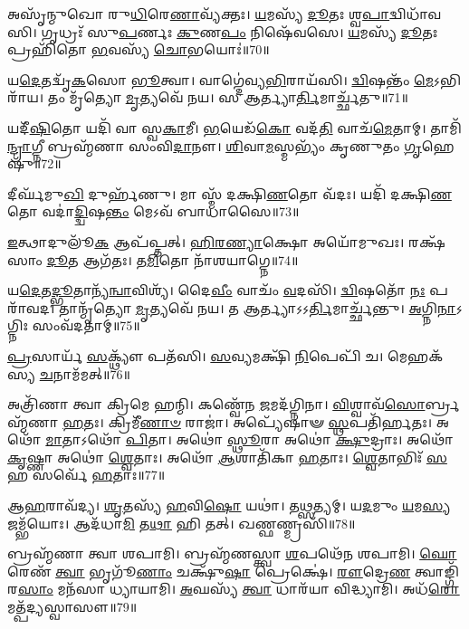𑌅𑌸𑍃᳴𑌨𑍍𑌮𑍁𑌖𑍋 𑌰𑍁\-\ul{𑌧𑌿}\-𑌰𑍇\-\ul{𑌣𑌾}\-𑌵𑍍𑌯᳴𑌕𑍍𑌤𑌃। 
\-\ul{𑌯}\-𑌮𑌸𑍍𑌯᳴ \ul{𑌦𑍂}\-𑌤𑌃  𑌶𑍍𑌵\-\ul{𑌪𑌾}\-𑌦𑍍𑌵𑌿𑌧𑌾᳴𑌵𑌸𑌿। 
𑌗𑍃𑌧𑍍𑌰𑌃᳴ 𑌸𑍁\-\ul{𑌪}\-𑌰𑍍𑌣𑌃 \ul{𑌕𑍁}\-𑌣\-\ul{𑌪𑌂} 𑌨𑌿𑌷𑍇᳴𑌵𑌸𑍇। 
\-\ul{𑌯}\-𑌮𑌸𑍍𑌯᳴ \ul{𑌦𑍂}\-𑌤𑌃 𑌪𑍍𑌰𑌹𑌿᳴𑌤𑍋 \ul{𑌭}\-𑌵𑌸𑍍𑌯᳴ \ul{𑌚𑍋}\-𑌭𑌯𑍋𑌃॑॥70॥%
\anuvakamend

𑌯\-\ul{𑌦𑍇}\-𑌤𑌦𑍍𑌵𑍃᳴\-\ul{𑌕}\-𑌸𑍋 \ul{𑌭𑍂}\-𑌤𑍍𑌵𑌾। 
𑌵𑌾𑌗𑍍𑌦𑍇॑𑌵𑍍𑌯\-\ul{𑌭𑌿}\-𑌰𑌾𑌯᳴𑌸𑌿। 
\-\ul{𑌦𑍍𑌵𑌿}\-𑌷𑌨𑍍𑌤𑌂᳴ \ul{𑌮𑍇}\-𑌽𑌭𑌿𑌰𑌾᳴𑌯। 
𑌤𑌂 𑌮𑍃᳴𑌤𑍍𑌯𑍋 \ul{𑌮𑍃}\-𑌤𑍍𑌯𑌵𑍇᳴ 𑌨𑌯। 
𑌸 𑌆𑌰𑍍𑌤𑍍𑌯𑌾\-\ul{𑌰𑍍𑌤𑌿}\-𑌮𑌾𑌰𑍍𑌚𑍍𑌛᳴𑌤𑍁॥71॥%
\anuvakamend

𑌯𑌦𑍀᳴\-\ul{𑌷𑌿}\-𑌤𑍋 𑌯𑌦𑌿᳴ 𑌵𑌾 𑌸𑍍𑌵\-\ul{𑌕𑌾}\-𑌮𑍀। 
\-\ul{𑌭}\-𑌯𑍇𑌡᳴\-\ul{𑌕𑍋} 𑌵𑌦᳴\-\ul{𑌤𑌿} 𑌵𑌾𑌚᳴\-\ul{𑌮𑍇}\-𑌤𑌾𑌮𑍍। 
𑌤𑌾𑌮𑌿᳴\-\ul{𑌨𑍍𑌦𑍍𑌰𑌾}\-𑌗𑍍𑌨𑍀 𑌬𑍍𑌰𑌹𑍍𑌮᳴𑌣𑌾 𑌸𑌂𑌵𑌿\-\ul{𑌦𑌾}\-𑌨𑍗। 
\-\ul{𑌶𑌿}\-𑌵𑌾\-\ul{𑌮}\-𑌸𑍍𑌮𑌭𑍍𑌯𑌂᳴ 𑌕𑍃𑌣𑍁𑌤𑌂 \ul{𑌗𑍃}\-𑌹𑍇𑌷𑍁᳴॥72॥%
\anuvakamend

𑌦𑍀𑌰𑍍𑌘᳴𑌮𑍁\-\ul{𑌖𑌿} 𑌦𑍁𑌰𑍍\mbox{}𑌹᳴𑌣𑍁। 
𑌮𑌾 𑌸𑍍𑌮᳴ 𑌦𑌕𑍍𑌷𑌿\-\ul{𑌣}\-𑌤𑍋 𑌵᳴𑌦𑌃। 
𑌯𑌦𑌿᳴ 𑌦𑌕𑍍𑌷𑌿\-\ul{𑌣}\-𑌤𑍋 𑌵𑌦𑌾॑\-\ul{𑌦𑍍𑌦𑍍𑌵𑌿}\-𑌷\-\ul{𑌨𑍍𑌤𑌂} 𑌮𑍇𑌽𑌵᳴ 𑌬𑌾𑌧𑌾𑌸𑍈॥73॥
\anuvakamend

\-\ul{𑌇}\-𑌤𑍍𑌥𑌾𑌦𑍁𑌲𑍂᳴\-\ul{𑌕} 𑌆𑌪᳴𑌪𑍍𑌤𑌤𑍍। 
\-\ul{𑌹𑌿}\-\-\ul{𑌰}\-\-\ul{𑌣𑍍𑌯𑌾}\-𑌕𑍍𑌷𑍋 𑌅𑌯𑍋᳴𑌮𑍁𑌖𑌃। 
𑌰𑌕𑍍𑌷᳴𑌸𑌾𑌂 \ul{𑌦𑍂}\-𑌤 𑌆𑌗᳴𑌤𑌃। 
𑌤\-\ul{𑌮𑌿}\-𑌤𑍋 𑌨𑌾᳴𑌶𑌯𑌾𑌗𑍍𑌨𑍇॥74॥
\anuvakamend


𑌯\-\ul{𑌦𑍇}\-𑌤\-\ul{𑌦𑍍𑌭𑍂}\-𑌤𑌾𑌨𑍍𑌯᳴\-\ul{𑌨𑍍𑌵𑌾}\-𑌵𑌿𑌶𑍍𑌯᳴। 
𑌦𑍈\-\ul{𑌵𑍀𑌂} 𑌵𑌾𑌚𑌂᳴ \ul{𑌵}\-𑌦𑌸𑌿᳴। 
\-\ul{𑌦𑍍𑌵𑌿}\-𑌷𑌤𑍋᳴ \ul{𑌨𑌃} 𑌪𑌰𑌾᳴𑌵𑌦। 
𑌤𑌾𑌨𑍍𑌮𑍃᳴𑌤𑍍𑌯𑍋 \ul{𑌮𑍃}\-𑌤𑍍𑌯𑌵𑍇᳴ 𑌨𑌯। 
𑌤 𑌆𑌰𑍍𑌤𑍍𑌯𑌾𑌽𑌽\-\ul{𑌰𑍍𑌤𑌿}\-𑌮𑌾𑌰𑍍𑌚𑍍𑌛᳴𑌨𑍍𑌤𑍁। 
\-\ul{𑌅}\-𑌗𑍍𑌨𑌿\-\ul{𑌨𑌾}\-𑌽𑌗𑍍𑌨𑌿𑌃 𑌸𑌂𑌵᳴𑌦𑌤𑌾𑌮𑍍॥75॥
\anuvakamend


\-\ul{𑌪𑍍𑌰}\-𑌸𑌾𑌰𑍍𑌯᳴ \ul{𑌸}\-𑌕𑍍𑌥𑍍𑌯𑍗᳴ 𑌪𑌤᳴𑌸𑌿। 
\-\ul{𑌸}\-𑌵𑍍𑌯𑌮𑌕𑍍𑌷𑌿᳴ \ul{𑌨𑌿}\-𑌪𑍇𑌪𑌿᳴ 𑌚। 
𑌮𑍇𑌹𑌕᳴𑌸𑍍𑌯 \ul{𑌚}\-𑌨𑌾𑌮᳴𑌮𑌤𑍍॥76॥
\anuvakamend


𑌅𑌤𑍍𑌰𑌿᳴𑌣𑌾 𑌤𑍍𑌵𑌾 𑌕𑍍𑌰𑌿𑌮𑍇 𑌹𑌨𑍍𑌮𑌿। 
𑌕𑌣𑍍𑌵𑍇᳴𑌨 \ul{𑌜}\-𑌮𑌦᳴𑌗𑍍𑌨𑌿𑌨𑌾। 
\-\ul{𑌵𑌿}\-𑌶𑍍𑌵𑌾𑌵᳴\-\ul{𑌸𑍋}\-𑌰𑍍𑌬𑍍𑌰𑌹𑍍𑌮᳴𑌣𑌾 \ul{𑌹}\-𑌤𑌃। 
𑌕𑍍𑌰𑌿𑌮𑍀᳴\-\ul{𑌣𑌾}\-\-\ul{𑍞} 𑌰𑌾𑌜𑌾॑। 
𑌅𑌪𑍍𑌯𑍇᳴𑌷𑌾𑍟 \ul{𑌸𑍍𑌥}\-𑌪𑌤𑌿᳴𑌰𑍍\mbox{}\-\ul{𑌹}\-𑌤𑌃। 
𑌅𑌥𑍋᳴ \ul{𑌮𑌾}\-𑌤𑌾𑌽𑌥𑍋᳴ \ul{𑌪𑌿}\-𑌤𑌾। 
𑌅𑌥𑍋॑ \ul{𑌸𑍍𑌥𑍂}\-𑌰𑌾 𑌅𑌥𑍋॑ \ul{𑌕𑍍𑌷𑍁}\-𑌦𑍍𑌰𑌾𑌃। 
𑌅𑌥𑍋᳴ \ul{𑌕𑍃}\-𑌷𑍍𑌣𑌾 𑌅𑌥𑍋॑ \ul{𑌶𑍍𑌵𑍇}\-𑌤𑌾𑌃। 
𑌅𑌥𑍋᳴ \ul{𑌆}\-𑌶𑌾𑌤𑌿᳴𑌕𑌾 \ul{𑌹}\-𑌤𑌾𑌃। 
\-\ul{𑌶𑍍𑌵𑍇}\-𑌤𑌾𑌭𑌿𑌃᳴ \ul{𑌸}\-𑌹 𑌸𑌰𑍍𑌵𑍇᳴ \ul{𑌹}\-𑌤𑌾𑌃॥77॥
\anuvakamend


𑌆\-\ul{𑌹}\-𑌰𑌾𑌵᳴𑌦𑍍𑌯। 
\-\ul{𑌶𑍃}\-𑌤𑌸𑍍𑌯᳴ \ul{𑌹}\-𑌵𑌿\-\ul{𑌷𑍋} 𑌯𑌥𑌾॑। 
𑌤\-\ul{𑌥𑍍𑌸}\-𑌤𑍍𑌯𑌮𑍍। 
𑌯\-\ul{𑌦}\-𑌮𑍁𑌂 \ul{𑌯}\-𑌮\-\ul{𑌸𑍍𑌯} 𑌜𑌮𑍍𑌭᳴𑌯𑍋𑌃। 
𑌆𑌦᳴𑌧𑌾\-\ul{𑌮𑌿} 𑌤\-\ul{𑌥𑌾} 𑌹𑌿 𑌤𑌤𑍍। 
𑌖𑌣𑍍𑌫𑌣𑍍𑌮𑍍𑌰𑌸𑌿᳴॥78॥
\anuvakamend


𑌬𑍍𑌰𑌹𑍍𑌮᳴𑌣𑌾 𑌤𑍍𑌵𑌾 𑌶𑌪𑌾𑌮𑌿। 
𑌬𑍍𑌰𑌹𑍍𑌮᳴𑌣𑌸𑍍𑌤𑍍𑌵𑌾 \ul{𑌶}\-𑌪𑌥𑍇᳴𑌨 𑌶𑌪𑌾𑌮𑌿। 
\-\ul{𑌘𑍋}\-𑌰𑍇𑌣᳴ \ul{𑌤𑍍𑌵𑌾} 𑌭𑍃𑌗𑍂᳴\-\ul{𑌣𑌾𑌂} 𑌚𑌕𑍍𑌷𑍁᳴\-\ul{𑌷𑌾} 𑌪𑍍𑌰𑍇𑌕𑍍𑌷𑍇॑। 
\-\ul{𑌰𑍗}\-𑌦𑍍𑌰𑍇\-\ul{𑌣} 𑌤𑍍𑌵𑌾𑌙𑍍𑌗𑌿᳴𑌰\-\ul{𑌸𑌾𑌂} 𑌮𑌨᳴𑌸𑌾 𑌧𑍍𑌯𑌾𑌯𑌾𑌮𑌿। 
\-\ul{𑌅}\-𑌘𑌸𑍍𑌯᳴ \ul{𑌤𑍍𑌵𑌾} 𑌧𑌾𑌰᳴𑌯𑌾 𑌵𑌿𑌦𑍍𑌧𑍍𑌯𑌾𑌮𑌿। 
𑌅𑌧᳴\-\ul{𑌰𑍋} 𑌮𑌤𑍍𑌪᳴𑌦𑍍𑌯𑌸𑍍𑌵𑌾𑌸𑍗॥79॥%
\anuvakamend


